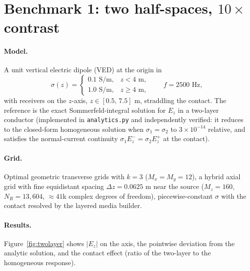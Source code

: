 \documentclass[11pt]{article}
\begin{document}
\section{Benchmark 1: two half-spaces, $10\times$ contrast}

\paragraph{Model.} A unit vertical electric dipole (VED) at the origin in
\[
\sigma(z) = \begin{cases} 0.1 \text{ S/m}, & z < 4\text{ m},\\
1.0 \text{ S/m}, & z \ge 4 \text{ m},\end{cases}
\qquad f = 2500 \text{ Hz},
\]
with receivers on the $z$-axis, $z\in[0.5,\,7.5]$ m, straddling the contact.
The reference is the exact Sommerfeld-integral solution for $E_z$ in a
two-layer conductor (implemented in \texttt{analytics.py} and independently
verified: it reduces to the closed-form homogeneous solution when
$\sigma_1=\sigma_2$ to $3\times10^{-14}$ relative, and satisfies the
normal-current continuity $\sigma_1 E_z^- = \sigma_2 E_z^+$ at the contact).

\paragraph{Grid.} Optimal geometric transverse grids with $k=3$
($M_x=M_y=12$), a hybrid axial grid with fine equidistant spacing
$\Delta z = 0.0625$ m near the source ($M_z=160$, $N_R = 13{,}604$,
$\approx 41$k complex degrees of freedom), piecewise-constant $\sigma$ with
the contact resolved by the layered media builder.

\paragraph{Results.} Figure~\ref{fig:twolayer} shows $|E_z|$ on the axis, the
pointwise deviation from the analytic solution, and the contact effect
(ratio of the two-layer to the homogeneous response).
\end{document}
